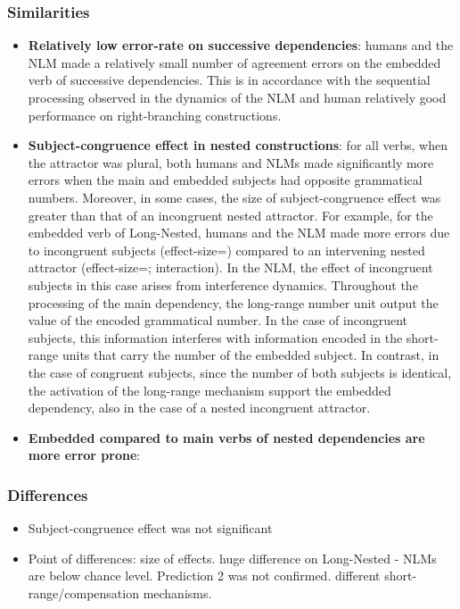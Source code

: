 \subsubsection{Similarities}
\begin{itemize}
    \item \textbf{Relatively low error-rate on successive dependencies}: humans and the NLM made a relatively small number of agreement errors on the embedded verb of successive dependencies. This is in accordance with the sequential processing observed in the dynamics of the NLM and human relatively good performance on right-branching constructions. 
    \item \textbf{Subject-congruence effect in nested constructions}: for all verbs, when the attractor was plural, both humans and NLMs made significantly more errors when the main and embedded subjects had opposite grammatical numbers. Moreover, in some cases, the size of subject-congruence effect was greater than that of an incongruent nested attractor. For example, for the embedded verb of Long-Nested, humans and the NLM made more errors due to incongruent subjects (effect-size=) compared to an intervening nested attractor (effect-size=; interaction). In the NLM, the effect of incongruent subjects in this case arises from interference dynamics. Throughout the processing of the main dependency, the long-range number unit output the value of the encoded grammatical number. In the case of incongruent subjects, this information interferes with information encoded in the short-range units that carry the number of the embedded subject. In contrast, in the case of congruent subjects, since the number of both subjects is identical, the activation of the long-range mechanism support the embedded dependency, also in the case of a nested incongruent attractor.
    \item \textbf{Embedded compared to main verbs of nested dependencies are more error prone}:
    
\end{itemize}
\subsubsection{Differences}
\begin{itemize}
    \item Subject-congruence effect was not significant 
\end{itemize}


    \begin{itemize}
        \item Point of differences: size of effects. huge difference on Long-Nested - NLMs are below chance level. Prediction 2 was not confirmed. different short-range/compensation mechanisms.
    \end{itemize}
    
